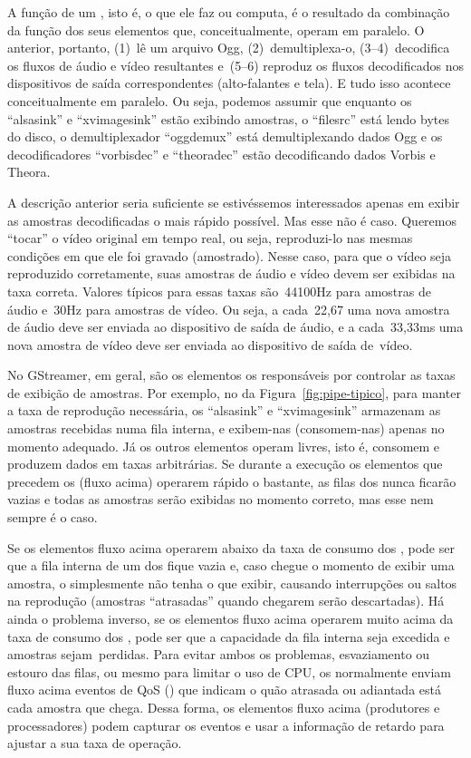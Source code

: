 \documentclass{SBCbookchapter}
\begin{document}
A função de um , isto é, o que ele faz ou computa, é o
resultado da combinação da função dos seus elementos que, conceitualmente,
operam em paralelo.  O  anterior, portanto, (1)~lê um arquivo
Ogg, (2)~demultiplexa-o, (3--4)~decodifica os fluxos de áudio e vídeo
resultantes e~(5--6) reproduz os fluxos decodificados nos dispositivos de
saída correspondentes (alto-falantes e tela).  E tudo isso acontece
conceitualmente em paralelo.  Ou seja, podemos assumir que enquanto os
 ``alsasink'' e ``xvimagesink'' estão exibindo amostras, o
 ``filesrc'' está lendo bytes do disco, o demultiplexador
``oggdemux'' está demultiplexando dados Ogg e os decodificadores
``vorbisdec'' e ``theoradec'' estão decodificando dados Vorbis e Theora.

A descrição anterior seria suficiente se estivéssemos interessados apenas em
exibir as amostras decodificadas o mais rápido possível.  Mas esse não é
caso.  Queremos ``tocar'' o vídeo original em tempo real, ou seja,
reproduzi-lo nas mesmas condições em que ele foi gravado (amostrado).  Nesse
caso, para que o vídeo seja reproduzido corretamente, suas amostras de áudio
e vídeo devem ser exibidas na taxa correta.  Valores típicos para essas
taxas são~44100Hz para amostras de áudio e~30Hz para amostras de vídeo.  Ou
seja, a cada~22{,}67 uma nova amostra de áudio deve ser enviada ao
dispositivo de saída de áudio, e a cada~33{,}33ms uma nova amostra de vídeo
deve ser enviada ao dispositivo de saída de~vídeo.

No GStreamer, em geral, são os elementos  os responsáveis por
controlar as taxas de exibição de amostras.  Por exemplo, no 
da Figura~\ref{fig:pipe-tipico}, para manter a taxa de reprodução
necessária, os  ``alsasink'' e ``xvimagesink'' armazenam as
amostras recebidas numa fila interna, e exibem-nas (consomem-nas) apenas no
momento adequado.  Já os outros elementos operam livres, isto é, consomem e
produzem dados em taxas arbitrárias.  Se durante a execução os elementos que
precedem os  (fluxo acima) operarem rápido o bastante, as filas
dos  nunca ficarão vazias e todas as amostras serão exibidas no
momento correto, mas esse nem sempre é o caso.

Se os elementos fluxo acima operarem abaixo da taxa de consumo dos
, pode ser que a fila interna de um dos  fique vazia e,
caso chegue o momento de exibir uma amostra, o  simplesmente não
tenha o que exibir, causando interrupções ou saltos na reprodução (amostras
``atrasadas'' quando chegarem serão descartadas).  Há ainda o problema
inverso, se os elementos fluxo acima operarem muito acima da taxa de consumo
dos , pode ser que a capacidade da fila interna seja excedida e
amostras sejam~perdidas.  Para evitar ambos os problemas, esvaziamento ou
estouro das filas, ou mesmo para limitar o uso de CPU, os 
normalmente enviam fluxo acima eventos de QoS () que
indicam o quão atrasada ou adiantada está cada amostra que chega.  Dessa
forma, os elementos fluxo acima (produtores e processadores) podem capturar
os eventos e usar a informação de retardo para ajustar a sua taxa de
operação.
\end{document}
